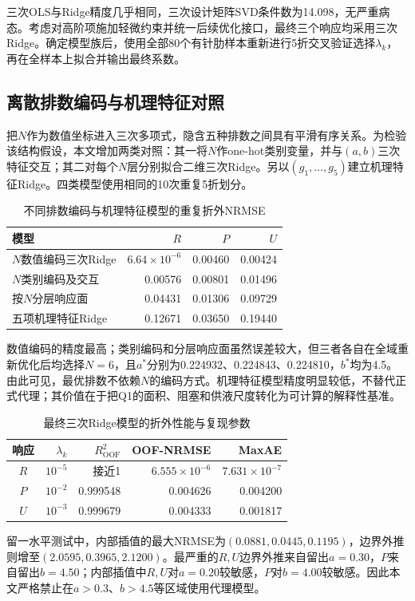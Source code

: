 \documentclass[UTF8,12pt,a4paper]{ctexart}
\begin{document}
三次OLS与Ridge精度几乎相同，三次设计矩阵SVD条件数为14.098，无严重病态。考虑对高阶项施加轻微约束并统一后续优化接口，最终三个响应均采用三次Ridge。确定模型族后，使用全部80个有针肋样本重新进行5折交叉验证选择$\lambda_k$，再在全样本上拟合并输出最终系数。

\subsection{离散排数编码与机理特征对照}
把$N$作为数值坐标进入三次多项式，隐含五种排数之间具有平滑有序关系。为检验该结构假设，本文增加两类对照：其一将$N$作one-hot类别变量，并与$(a,b)$三次特征交互；其二对每个$N$层分别拟合二维三次Ridge。另以$(g_1,\ldots,g_5)$建立机理特征Ridge。四类模型使用相同的10次重复5折划分。

\begin{table}[H]\centering\small
\caption{不同排数编码与机理特征模型的重复折外NRMSE}
\begin{tabular}{lrrr}
\toprule
模型&$R$&$P$&$U$\\\midrule
$N$数值编码三次Ridge&$6.64\times10^{-6}$&0.00460&0.00424\\
$N$类别编码及交互&0.00576&0.00801&0.01496\\
按$N$分层响应面&0.04431&0.01306&0.09729\\
五项机理特征Ridge&0.12671&0.03650&0.19440\\
\bottomrule
\end{tabular}
\end{table}
数值编码的精度最高；类别编码和分层响应面虽然误差较大，但三者各自在全域重新优化后均选择$N=6$，且$a^*$分别为0.224932、0.224843、0.224810，$b^*$均为4.5。由此可见，最优排数不依赖$N$的编码方式。机理特征模型精度明显较低，不替代正式代理；其价值在于把Q1的面积、阻塞和供液尺度转化为可计算的解释性基准。

\begin{table}[H]\centering\small
\caption{最终三次Ridge模型的折外性能与复现参数}
\begin{tabular}{crrrr}
\toprule
响应&$\lambda_k$&$R^2_{\mathrm{OOF}}$&OOF-NRMSE&MaxAE\\\midrule
$R$&$10^{-5}$&接近1&$6.555\times10^{-6}$&$7.631\times10^{-7}$\\
$P$&$10^{-2}$&0.999548&0.004626&0.004200\\
$U$&$10^{-3}$&0.999679&0.004333&0.001817\\
\bottomrule
\end{tabular}
\end{table}

留一水平测试中，内部插值的最大NRMSE为$(0.0881,0.0445,0.1195)$，边界外推则增至$(2.0595,0.3965,2.1200)$。最严重的$R,U$边界外推来自留出$a=0.30$，$P$来自留出$b=4.50$；内部插值中$R,U$对$a=0.20$较敏感，$P$对$b=4.00$较敏感。因此本文严格禁止在$a>0.3$、$b>4.5$等区域使用代理模型。
\end{document}
